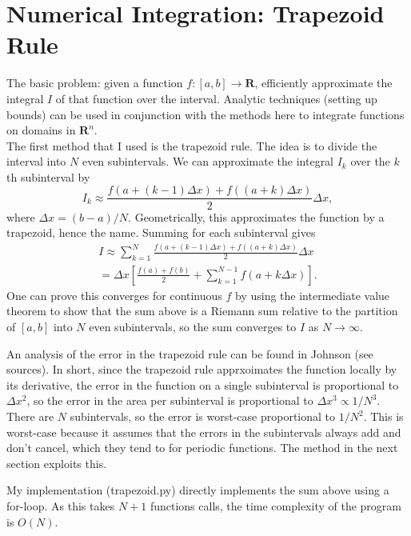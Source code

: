 \documentclass[11pt]{article}
\theoremstyle{plain}
\begin{document}
\section{Numerical Integration: Trapezoid Rule}
The basic problem: given a function $f:[a,b]\to\mathbf{R}$, efficiently approximate the integral $I$ of that function over the interval. Analytic techniques (setting up bounds) can be used in conjunction with the methods here to integrate functions on domains in $\mathbf{R}^n$.\\
\indent The first method that I used is the trapezoid rule. The idea is to divide the interval into $N$ even subintervals. We can approximate the integral $I_k$ over the $k$th subinterval by
\begin{equation*}
	I_k \approx \frac{f(a+(k-1)\Delta x) + f((a+k)\Delta x)}{2}\Delta x,
\end{equation*}
where $\Delta x = (b-a)/N$. Geometrically, this approximates the function by a trapezoid, hence the name. Summing for each subinterval gives
\begin{align*}
	I \approx \sum_{k=1}^N \frac{f(a+(k-1)\Delta x) + f((a+k)\Delta x)}{2}\Delta x \\
	= \Delta x\left[\frac{f(a)+f(b)}{2} + \sum_{k=1}^{N-1} f(a + k\Delta x)\right].
\end{align*}
One can prove this converges for continuous $f$ by using the intermediate value theorem to show that the sum above is a Riemann sum relative to the partition of $[a,b]$ into $N$ even subintervals, so the sum converges to $I$ as $N\to\infty$.
\par
An analysis of the error in the trapezoid rule can be found in Johnson (see sources). In short, since the trapezoid rule apprxoimates the function locally by its derivative, the error in the function on a single subinterval is proportional to $\Delta x^2$, so the error in the area per subinterval is proportional to $\Delta x^3 \propto 1/N^3$. There are $N$ subintervals, so the error is worst-case proportional to $1/N^2$. This is worst-case because it assumes that the errors in the subintervals always add and don't cancel, which they tend to for periodic functions. The method in the next section exploits this.
\par
\indent My implementation (trapezoid.py) directly implements the sum above using a for-loop. As this takes $N+1$ functions calls, the time complexity of the program is $O(N)$.
\end{document}
